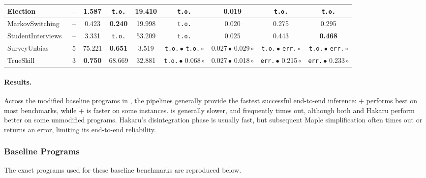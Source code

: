 \begin{table}[H]
{\begin{tabular}{lcccccccc}
    \midrule
    Election~\cite{Saad2021SPPL} & -- & \textbf{1.587} & \texttt{t.o.} & 19.410 &
    \texttt{t.o.} & 0.019 & \texttt{t.o.} & \texttt{t.o.} \\
    \midrule
    MarkovSwitching~\cite{Saad2021SPPL} & -- & 0.423 & \textbf{0.240} & 19.998 &
    \texttt{t.o.} & 0.020 & 0.275 & 0.295 \\
    \midrule
    StudentInterviews~\cite{Saad2021SPPL} & -- & 3.331 & \texttt{t.o.} & 53.209 &
    \texttt{t.o.} & 0.025 & 0.443 & \textbf{0.468} \\
    \midrule
    SurveyUnbias~\cite{gehr2016psi} & 5 & 75.221 & \textbf{0.651} & 3.519 &
    \makecell{\texttt{t.o.}\,$\bullet$ \\ \texttt{t.o.}\,$\circ$} &
    \makecell{0.027\,$\bullet$ \\ 0.029\,$\circ$} &
    \makecell{\texttt{t.o.}\,$\bullet$ \\ \texttt{err.}\,$\circ$} &
    \makecell{\texttt{t.o.}\,$\bullet$ \\ \texttt{err.}\,$\circ$} \\
    \midrule
    TrueSkill~\cite{gehr2016psi} & 3 & \textbf{0.750} & 68.669 & 32.881 &
    \makecell{\texttt{t.o.}\,$\bullet$ \\ 0.068\,$\circ$} &
    \makecell{0.027\,$\bullet$ \\ 0.018\,$\circ$} &
    \makecell{\texttt{err.}\,$\bullet$ \\ 0.215\,$\circ$} &
    \makecell{\texttt{err.}\,$\bullet$ \\ 0.233\,$\circ$} \\
    \bottomrule
    \end{tabular}  
}  
\end{table}

\paragraph{Results.} Across the modified baseline programs in , the \Slice{} pipelines generally provide the fastest successful end-to-end inference: \Slice{}+\Dice{} performs best on most benchmarks, while \Slice{}+\Roulette{} is faster on some instances. \SPPL{} is generally slower, and \PSI{} frequently times out, although both \PSI{} and Hakaru perform better on some unmodified programs. Hakaru's disintegration phase is usually fast, but subsequent Maple simplification often times out or returns an error, limiting its end-to-end reliability.


\clearpage
\subsubsection{Baseline Programs}\label{app:baseline-programs-full}
The exact \Slice{} programs used for these baseline benchmarks are reproduced below.


